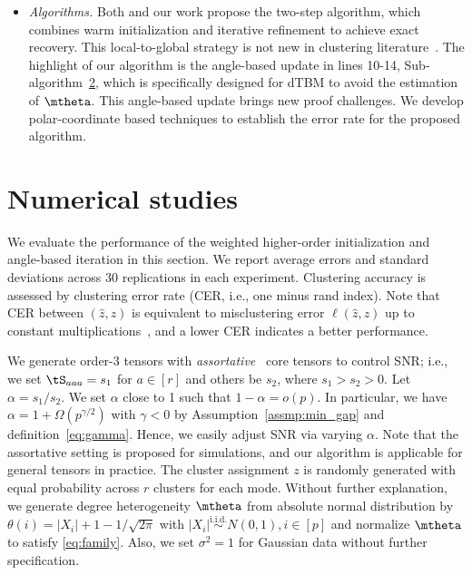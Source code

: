 \documentclass[lettersize,onecolumn,journal]{IEEEtran}
\theoremstyle{definition}
\theoremstyle{definition}
\begin{document}
{\begin{itemize}[wide]
    \item \textit{Algorithms.} Both \cite{han2020exact} and our work propose the two-step algorithm, which combines warm initialization and iterative refinement to achieve exact recovery. This local-to-global strategy is not new in clustering literature~\citep{gao2022iterative, chien2019minimax}. The highlight of our algorithm is the angle-based update in lines 10-14, Sub-algorithm~\hyperref[alg:main]{2}, which is specifically designed for dTBM to avoid the estimation of $\mtheta$. This angle-based update brings new proof challenges. We develop polar-coordinate based techniques to establish the error rate for the proposed algorithm. 
\end{itemize}
}


\section{Numerical studies}\label{sec:simulation}

 We evaluate the performance of the weighted higher-order initialization and angle-based iteration in this section. We report average errors and standard deviations across 30 replications in each experiment. Clustering accuracy is assessed by clustering error rate (CER, i.e., one minus rand index). Note that CER between $(\hat z, z)$ is equivalent to misclustering error $\ell(\hat z, z)$ up to constant multiplications~\citep{meilua2012local}, and a lower CER indicates a better performance.

We generate order-3 tensors with \emph{assortative}~\citep{gao2018community} core tensors to control SNR; i.e., we set $\tS_{aaa} = s_1$ for $a \in [r]$ and others be $s_2$, where $s_1 > s_2 > 0$. Let $\alpha = s_1/s_2$. We set $\alpha$ close to 1 such that $1-\alpha=o(p)$. In particular, we have $\alpha = 1 + \Omega(p^{\gamma/2})$ with $\gamma<0$ by Assumption~\ref{assmp:min_gap} and definition~\eqref{eq:gamma}. Hence, we easily adjust SNR via varying $\alpha$. Note that the assortative setting is proposed for simulations, and our algorithm is applicable for general tensors in practice. The cluster assignment $z$ is randomly generated with equal probability across  $r$ clusters for each mode. Without further explanation, we generate degree heterogeneity $\mtheta$ from absolute normal distribution by $\theta(i) = |X_i| + 1 - 1/\sqrt{2\pi}$ with $|X_i| \stackrel{\text{i.i.d.}}\sim N(0,1), i \in [p]$ and normalize $\mtheta$ to satisfy \eqref{eq:family}. Also, we set $\sigma^2 = 1$ for Gaussian data without further specification. 
\end{document}
